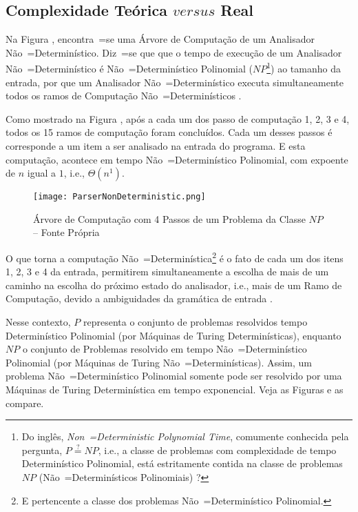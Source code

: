 \subsection{Complexidade Teórica $versus$ Real}

Na Figura ,
encontra~=se uma Árvore de Computação de um Analisador Não~=Determinístico.
Diz~=se que que o tempo de execução de um Analisador Não~=Determinístico é Não~=Determinístico Polinomial ($NP$\footnote{
Do inglês, \textit{Non~=Deterministic Polynomial Time},
comumente conhecida pela pergunta,
$P \stackrel{?}{=} NP$, i.e.,
a classe de problemas com complexidade de tempo Determinístico Polinomial,
está estritamente contida na classe de problemas $NP$ (Não~=Determinísticos Polinomiais) \cite{computationalComplexityAuroraBarak}?
})
ao tamanho da entrada,
por que um Analisador Não~=Determinístico executa simultaneamente todos os ramos de Computação Não~=Determinísticos \cite{hopcroftBook}.

Como mostrado na Figura ,
após a cada um dos passo de computação 1,
2, 3 e 4,
todos os 15 ramos de computação foram concluídos.
Cada um desses passos é corresponde a um item a ser analisado na entrada do programa.
E esta computação,
acontece em tempo Não~=Determinístico Polinomial,
com expoente de $n$ igual a $1$,
i.e.,
$\Theta(n^1)$.
\begin{figure}[h]
\centering
\texttt{[image: ParserNonDeterministic.png]}
\caption[Árvore de Computação com 4 Passos de um Problema da Classe $NP$]{Árvore de Computação com 4 Passos\protect\footnotemark{} de um Problema da Classe $NP$ -- Fonte Própria}
\label{ParserNonDeterministic}
\end{figure}

O que torna a computação Não~=Determinística\footnote{
E pertencente a classe dos problemas Não~=Determinístico Polinomial.
} é o fato de cada um dos itens 1,
2, 3 e 4 da entrada,
permitirem simultaneamente a escolha de mais de um caminho na escolha do próximo estado do analisador,
i.e.,
mais de um Ramo de Computação,
devido a ambiguidades da gramática de entrada \cite{antlrBookTerrentParr}.

Nesse contexto,
$P$ representa o conjunto de problemas resolvidos tempo Determinístico Polinomial (por Máquinas de Turing Determinísticas),
enquanto $NP$ o conjunto de Problemas resolvido em tempo Não~=Determinístico Polinomial (por Máquinas de Turing Não~=Determinísticas).
Assim,
um problema Não~=Determinístico Polinomial somente pode ser resolvido por uma Máquinas de Turing Determinística em tempo exponencial.
Veja as Figuras  e
as compare.


